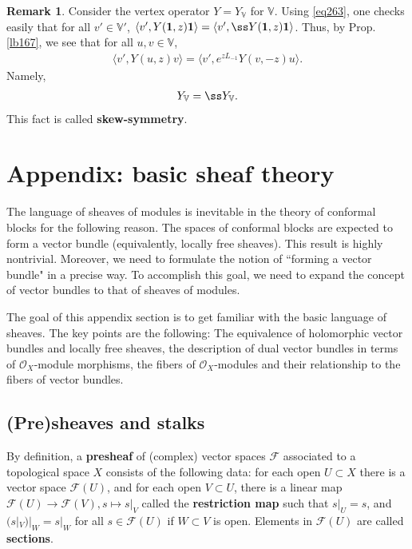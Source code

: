 \documentclass[11pt,b5paper,notitlepage]{article}
\theoremstyle{definition}
\newtheorem{rem}[df]{Remark}
\theoremstyle{plain}
\newcommand{\id}{\mathbf{1}}
\newcommand{\bk}[1]{\langle {#1}\rangle}
\newcommand{\scr}{\mathscr}
\newcommand{\Vbb}{\mathbb V}
\numberwithin{equation}{section}
\begin{document}
\begin{rem}
Consider the vertex operator $Y=Y_\Vbb$ for $\Vbb$. Using \eqref{eq263}, one checks easily that for all $v'\in\Vbb'$, $\bk{v',Y(\id,z)\id}=\bk{v',\ss Y(\id,z)\id}$. Thus, by Prop. \ref{lb167}, we see that for all $u,v\in\Vbb$,
\begin{align}
\bk{v',Y(u,z)v}=\bk{v',e^{zL_{-1}}Y(v,-z)u}.
\end{align}
Namely,
\begin{align}
Y_\Vbb=\ss Y_\Vbb.
\end{align}
This fact is called \textbf{skew-symmetry}.
\end{rem}



\appendix

\section{Appendix: basic sheaf theory}

The language of sheaves of modules is inevitable in the theory of conformal blocks for the following reason. The spaces of conformal blocks are expected to form a vector bundle (equivalently, locally free sheaves). This result is highly nontrivial. Moreover, we need to formulate the notion of ``forming a vector bundle" in a precise way. To accomplish this goal, we need to expand the concept of vector bundles to that of sheaves of modules.



The goal of this appendix section is to get familiar with the basic language of sheaves. The key points are the following: The equivalence of holomorphic vector bundles and locally free sheaves, the description of dual vector bundles in terms of $\scr O_X$-module morphisms, the fibers of $\scr O_X$-modules and their relationship to the fibers of vector bundles.



\subsection{(Pre)sheaves and stalks}

By definition, a \textbf{presheaf} of (complex) vector spaces $\scr F$ associated to a topological space $X$ consists of the following data: for each open $U\subset X$ there is a vector space $\scr F(U)$, and for each open $V\subset U$, there is a linear map $\scr F(U)\rightarrow\scr F(V),s\mapsto s|_V$ called the \textbf{restriction map} such that $s|_U=s$, and $(s|_V)|_W=s|_W$ for all $s\in\scr F(U)$ if $W\subset V$ is open. Elements in $\scr F(U)$ are called \textbf{sections}.
\end{document}
